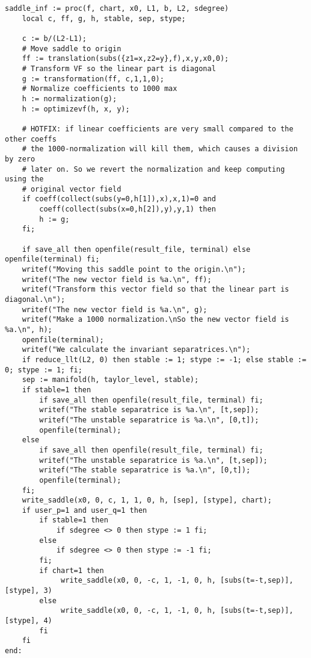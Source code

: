 \documentclass[a4paper,10pt]{article}
\begin{document}
\begin{lstlisting}[name=infinity]
saddle_inf := proc(f, chart, x0, L1, b, L2, sdegree)
    local c, ff, g, h, stable, sep, stype;

    c := b/(L2-L1);
    # Move saddle to origin
    ff := translation(subs({z1=x,z2=y},f),x,y,x0,0);
    # Transform VF so the linear part is diagonal
    g := transformation(ff, c,1,1,0);
    # Normalize coefficients to 1000 max
    h := normalization(g);
    h := optimizevf(h, x, y);

    # HOTFIX: if linear coefficients are very small compared to the other coeffs
    # the 1000-normalization will kill them, which causes a division by zero
    # later on. So we revert the normalization and keep computing using the
    # original vector field
    if coeff(collect(subs(y=0,h[1]),x),x,1)=0 and
        coeff(collect(subs(x=0,h[2]),y),y,1) then
        h := g;
    fi;

    if save_all then openfile(result_file, terminal) else openfile(terminal) fi;
    writef("Moving this saddle point to the origin.\n");
    writef("The new vector field is %a.\n", ff);
    writef("Transform this vector field so that the linear part is diagonal.\n");
    writef("The new vector field is %a.\n", g);
    writef("Make a 1000 normalization.\nSo the new vector field is %a.\n", h);
    openfile(terminal);
    writef("We calculate the invariant separatrices.\n");
    if reduce_llt(L2, 0) then stable := 1; stype := -1; else stable := 0; stype := 1; fi;
    sep := manifold(h, taylor_level, stable);
    if stable=1 then
        if save_all then openfile(result_file, terminal) fi;
        writef("The stable separatrice is %a.\n", [t,sep]);
        writef("The unstable separatrice is %a.\n", [0,t]);
        openfile(terminal);
    else
        if save_all then openfile(result_file, terminal) fi;
        writef("The unstable separatrice is %a.\n", [t,sep]);
        writef("The stable separatrice is %a.\n", [0,t]);
        openfile(terminal);
    fi;
    write_saddle(x0, 0, c, 1, 1, 0, h, [sep], [stype], chart);
    if user_p=1 and user_q=1 then
        if stable=1 then
            if sdegree <> 0 then stype := 1 fi;
        else
            if sdegree <> 0 then stype := -1 fi;
        fi;
        if chart=1 then
             write_saddle(x0, 0, -c, 1, -1, 0, h, [subs(t=-t,sep)], [stype], 3)
        else
             write_saddle(x0, 0, -c, 1, -1, 0, h, [subs(t=-t,sep)], [stype], 4)
        fi
    fi
end:
\end{lstlisting}
\end{document}
